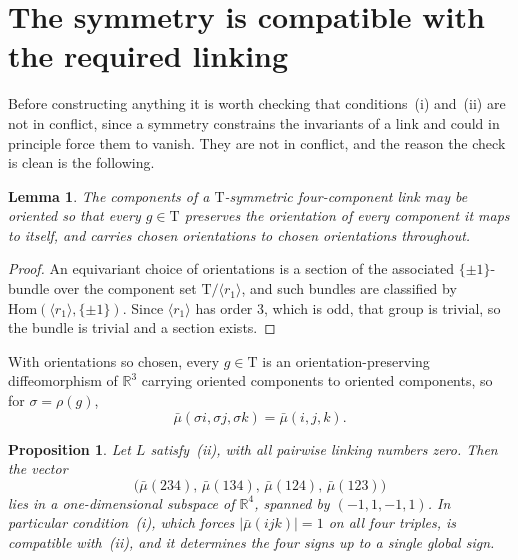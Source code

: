 \documentclass[11pt,a4paper]{article}
\theoremstyle{plain}
\newtheorem{proposition}[theorem]{Proposition}
\newtheorem{lemma}[theorem]{Lemma}
\theoremstyle{definition}
\newcommand{\RR}{\mathbb{R}}
\newcommand{\Tet}{\mathrm{T}}
\newcommand{\abs}[1]{\left|#1\right|}
\begin{document}
\section{The symmetry is compatible with the required linking}\label{sec:milnor}

Before constructing anything it is worth checking that conditions~(i) and~(ii)
are not in conflict, since a symmetry constrains the invariants of a link and
could in principle force them to vanish. They are not in conflict, and the
reason the check is clean is the following.

\begin{lemma}\label{lem:orient}
The components of a $\Tet$-symmetric four-component link may be oriented so
that every $g\in\Tet$ preserves the orientation of every component it maps to
itself, and carries chosen orientations to chosen orientations throughout.
\end{lemma}

\begin{proof}
An equivariant choice of orientations is a section of the associated
$\{\pm1\}$-bundle over the component set $\Tet/\langle r_1\rangle$, and such
bundles are classified by $\mathrm{Hom}(\langle r_1\rangle,\{\pm1\})$. Since
$\langle r_1\rangle$ has order $3$, which is odd, that group is trivial, so the
bundle is trivial and a section exists.
\end{proof}

With orientations so chosen, every $g\in\Tet$ is an orientation-preserving
diffeomorphism of $\RR^3$ carrying oriented components to oriented components,
so for $\sigma=\rho(g)$,
\begin{equation}\label{eq:muequivariance}
  \bar\mu(\sigma i,\sigma j,\sigma k)=\bar\mu(i,j,k).
\end{equation}

\begin{proposition}\label{prop:milnor}
Let $L$ satisfy~(ii), with all pairwise linking numbers zero. Then the vector
\[
  \big(\bar\mu(234),\,\bar\mu(134),\,\bar\mu(124),\,\bar\mu(123)\big)
\]
lies in a one-dimensional subspace of $\RR^4$, spanned by $(-1,1,-1,1)$. In
particular condition~(i), which forces $\abs{\bar\mu(ijk)}=1$ on all four
triples, is compatible with~(ii), and it determines the four signs up to a
single global sign.
\end{proposition}
\end{document}
